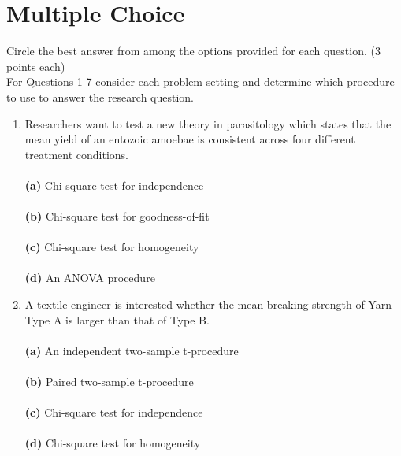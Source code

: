 \documentclass[12pt]{article}
\begin{document}
\section{Multiple Choice}
Circle the best answer from among the options provided for each question. (3 points each)\\


\noindent For Questions 1-7 consider each problem setting and determine which procedure to use to answer the research question. 

\begin{enumerate}[leftmargin=\labelsep]

\item Researchers want to test a new theory in parasitology which states that the mean yield of an entozoic amoebae is consistent across four different treatment conditions.\\ \vspace{1mm}\\
{\bf (a)} \hspace{2mm} Chi-square test for independence\\ \vspace{1mm}\\
{\bf (b)} \hspace{2mm} Chi-square test for goodness-of-fit\\   \vspace{1mm}\\
{\bf (c)} \hspace{2mm} Chi-square test for homogeneity\\  \vspace{1mm}\\
{\bf (d)} \hspace{2mm} An ANOVA procedure\\  

\item A textile engineer is interested whether the mean breaking strength of Yarn Type A is larger than that of Type B. \\ \vspace{1mm}\\
{\bf (a)} \hspace{2mm} An independent two-sample t-procedure\\  \vspace{1mm}\\
{\bf (b)} \hspace{2mm} Paired two-sample t-procedure\\   \vspace{1mm}\\
{\bf (c)} \hspace{2mm} Chi-square test for independence\\  \vspace{1mm}\\
{\bf (d)} \hspace{2mm} Chi-square test for homogeneity\\



\end{enumerate}
\end{document}
